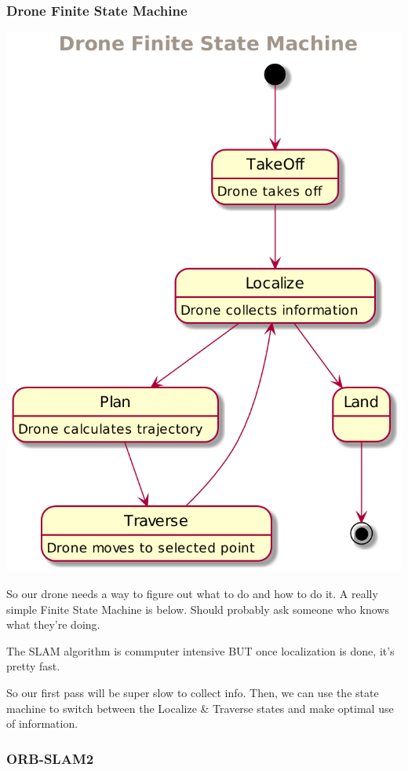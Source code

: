 \documentclass[unrestricted]{meetingnotesminutes}
\begin{document}
\subsubsection{Drone Finite State Machine}
\label{sec:org59c9b2f}
\begin{center}
\includegraphics[width=.9\linewidth]{drone-fsm.png}
\end{center}



So our drone needs a way to figure out what to do and how to do it.
A really simple Finite State Machine is below. Should probably ask someone who knows what they're doing.

The SLAM algorithm is commputer intensive BUT once localization is done, it's pretty fast.

So our first pass will be super slow to collect info.
Then, we can use the state machine to switch between the Localize \& Traverse states and make optimal use of information.

\subsubsection{ORB-SLAM2}
\label{sec:orga5e2177}
\end{document}
